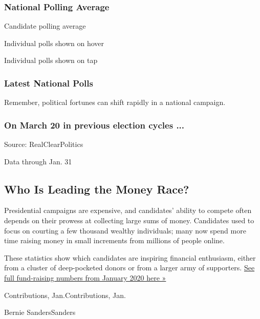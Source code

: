\hypertarget{national-polling-average}{%
\subsubsection{National Polling
Average}\label{national-polling-average}}

Candidate polling average

Individual polls shown on hover

Individual polls shown on tap

\hypertarget{latest-national-polls}{%
\subsubsection{Latest National Polls}\label{latest-national-polls}}

Remember, political fortunes can shift rapidly in a national campaign.

\hypertarget{on-march-20-in-previous-election-cycles-}{%
\subsubsection{On March 20 in previous election cycles
...}\label{on-march-20-in-previous-election-cycles-}}

Source: RealClearPolitics

Data through Jan. 31

\hypertarget{who-is-leading-the-money-race}{%
\subsection{Who Is Leading the Money
Race?}\label{who-is-leading-the-money-race}}

Presidential campaigns are expensive, and candidates' ability to compete
often depends on their prowess at collecting large sums of money.
Candidates used to focus on courting a few thousand wealthy individuals;
many now spend more time raising money in small increments from millions
of people online.

These statistics show which candidates are inspiring financial
enthusiasm, either from a cluster of deep-pocketed donors or from a
larger army of supporters.
\href{https://www.nytimes3xbfgragh.onion/interactive/2020/02/21/us/politics/democratic-fundraising-numbers-february.html}{See
full fund-raising numbers from January 2020 here »}

Contributions, Jan.Contributions, Jan.

Bernie SandersSanders

